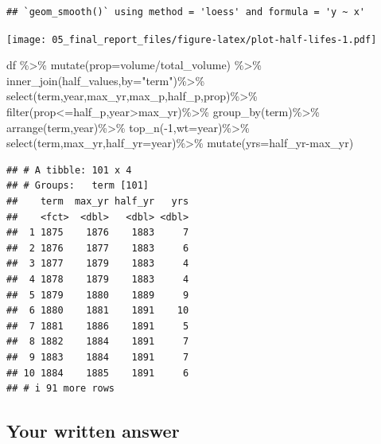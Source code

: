 \documentclass[
]{article}
\newenvironment{Shaded}{\begin{snugshade}}{\end{snugshade}}
\newcommand{\AttributeTok}[1]{\textcolor[rgb]{0.77,0.63,0.00}{#1}}
\newcommand{\DecValTok}[1]{\textcolor[rgb]{0.00,0.00,0.81}{#1}}
\newcommand{\FunctionTok}[1]{\textcolor[rgb]{0.00,0.00,0.00}{#1}}
\newcommand{\NormalTok}[1]{#1}
\newcommand{\SpecialCharTok}[1]{\textcolor[rgb]{0.00,0.00,0.00}{#1}}
\newcommand{\StringTok}[1]{\textcolor[rgb]{0.31,0.60,0.02}{#1}}
\begin{document}
\begin{verbatim}
## `geom_smooth()` using method = 'loess' and formula = 'y ~ x'
\end{verbatim}

\texttt{[image: 05\_final\_report\_files/figure-latex/plot-half-lifes-1.pdf]}

\begin{Shaded}
\begin{Highlighting}[]
\NormalTok{df }\SpecialCharTok{\%\textgreater{}\%} \FunctionTok{mutate}\NormalTok{(}\AttributeTok{prop=}\NormalTok{volume}\SpecialCharTok{/}\NormalTok{total\_volume) }\SpecialCharTok{\%\textgreater{}\%}
  \FunctionTok{inner\_join}\NormalTok{(half\_values,}\AttributeTok{by=}\StringTok{"term"}\NormalTok{)}\SpecialCharTok{\%\textgreater{}\%}
  \FunctionTok{select}\NormalTok{(term,year,max\_yr,max\_p,half\_p,prop)}\SpecialCharTok{\%\textgreater{}\%}
  \FunctionTok{filter}\NormalTok{(prop}\SpecialCharTok{\textless{}=}\NormalTok{half\_p,year}\SpecialCharTok{\textgreater{}}\NormalTok{max\_yr)}\SpecialCharTok{\%\textgreater{}\%}
  \FunctionTok{group\_by}\NormalTok{(term)}\SpecialCharTok{\%\textgreater{}\%}
  \FunctionTok{arrange}\NormalTok{(term,year)}\SpecialCharTok{\%\textgreater{}\%}
  \FunctionTok{top\_n}\NormalTok{(}\SpecialCharTok{{-}}\DecValTok{1}\NormalTok{,}\AttributeTok{wt=}\NormalTok{year)}\SpecialCharTok{\%\textgreater{}\%}
  \FunctionTok{select}\NormalTok{(term,max\_yr,}\AttributeTok{half\_yr=}\NormalTok{year)}\SpecialCharTok{\%\textgreater{}\%}
  \FunctionTok{mutate}\NormalTok{(}\AttributeTok{yrs=}\NormalTok{half\_yr}\SpecialCharTok{{-}}\NormalTok{max\_yr)}
\end{Highlighting}
\end{Shaded}

\begin{verbatim}
## # A tibble: 101 x 4
## # Groups:   term [101]
##    term  max_yr half_yr   yrs
##    <fct>  <dbl>   <dbl> <dbl>
##  1 1875    1876    1883     7
##  2 1876    1877    1883     6
##  3 1877    1879    1883     4
##  4 1878    1879    1883     4
##  5 1879    1880    1889     9
##  6 1880    1881    1891    10
##  7 1881    1886    1891     5
##  8 1882    1884    1891     7
##  9 1883    1884    1891     7
## 10 1884    1885    1891     6
## # i 91 more rows
\end{verbatim}

\hypertarget{your-written-answer-4}{%
\subsection{Your written answer}\label{your-written-answer-4}}
\end{document}
